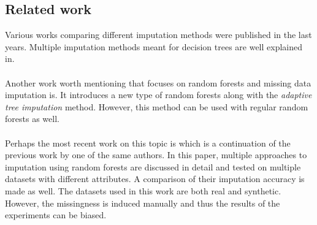 \documentclass[11pt]{article}
\begin{document}
    \subsection{Related work}
      Various works comparing different imputation methods were published in the last years. Multiple imputation methods meant for decision trees are well explained in\cite{mia}.
      \\~\\
      Another work worth mentioning that focuses on random forests and missing data imputation is\cite{rsf}. It introduces a new type of random forests along with the {\it adaptive tree imputation} method. However, this method can be used with regular random forests as well.
      \\~\\
      Perhaps the most recent work on this topic is\cite{otfi} which is a continuation of the previous work by one of the same authors. In this paper, multiple approaches to imputation using random forests are discussed in detail and tested on multiple datasets with different attributes. A comparison of their imputation accuracy is made as well. The datasets used in this work are both real and synthetic. However, the missingness is induced manually\cite{otfi} and thus the results of the experiments can be biased.
    \\~\\
\end{document}
